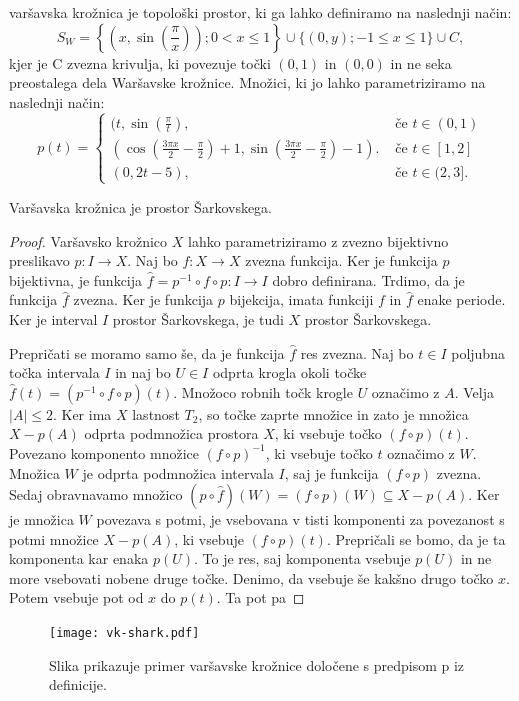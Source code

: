 \documentclass[../TG_magistrsko_delo_sections.tex]{subfiles}
\begin{document}
\begin{definicija}\label{def:vk}
varšavska krožnica je topološki prostor, ki ga lahko definiramo na naslednji način:
$$S_W = \left\{\left(x, \sin\left(\frac{\pi}{x}\right)\right); 0 < x \leq 1\right\} \cup \{(0, y); -1 \leq x \leq 1\} \cup C,$$
kjer je C zvezna krivulja, ki povezuje točki $(0,1)$ in $(0,0)$ in ne seka preostalega dela Waršavske krožnice.
Množici, ki jo lahko parametriziramo na naslednji način:
\[ p(t) = \begin{cases}
  (t, \sin(\frac{\pi}{t}), & \mbox{ če $t \in (0, 1) $}\\
 (\cos(\frac{3\pi x}{2}-\frac{\pi}{2})+1, \sin(\frac{3\pi x}{2}-\frac{\pi}{2})-1). & \mbox{ če $t \in [1, 2]$}\\
  (0, 2t-5), & \mbox{ če $t \in (2, 3]$.}
  \end{cases}
  \]
\end{definicija}

\begin{trditev}
Varšavska krožnica je prostor Šarkovskega.
\end{trditev}


\begin{proof}
Varšavsko krožnico $X$ lahko parametriziramo z zvezno bijektivno preslikavo $p:I \to X$. Naj bo $f: X \to X$ zvezna funkcija. Ker je funkcija $p$ bijektivna, je funkcija $\widehat{f} = p^{-1} \circ f \circ p : I \to I$ dobro definirana. Trdimo, da je funkcija $\widehat{f}$ zvezna. Ker je funkcija $p$ bijekcija, imata funkciji $f$ in $\widehat{f}$ enake periode. Ker je interval $I$ prostor Šarkovskega, je tudi $X$ prostor Šarkovskega. 

Prepričati se moramo samo še, da je funkcija $\widehat{f}$ res zvezna. Naj bo $t \in I$ poljubna točka intervala $I$ in naj bo $U \in I$ odprta krogla okoli točke $\widehat{f}(t) = (p^{-1} \circ f \circ p)(t)$. Množoco robnih točk krogle $U$ označimo z $A$. Velja $|A| \leq 2$. Ker ima $X$ lastnost $T_2$, so točke zaprte množice in zato je množica $X - p(A)$ odprta podmnožica prostora $X$, ki vsebuje točko $(f \circ p)(t)$. Povezano komponento množice $(f \circ p)^{-1}$, ki vsebuje točko $t$ označimo z $W$. Množica $W$ je odprta podmnožica intervala $I$, saj je funkcija $(f \circ p)$ zvezna. Sedaj obravnavamo množico $\left(p \circ \widehat{f}\right) (W) = (f \circ p)(W) \subseteq X - p(A)$. Ker je množica $W$ povezava s potmi, je vsebovana v tisti komponenti za povezanost s potmi množice $X-p(A)$, ki vsebuje $(f \circ p)(t)$. 
Prepričali se bomo, da je ta komponenta kar enaka $p(U)$. To je res, saj komponenta vsebuje $p(U)$ in ne more vsebovati nobene druge točke. Denimo, da vsebuje še kakšno drugo točko $x$. Potem vsebuje pot od $x$ do $p(t)$. Ta pot pa  
\end{proof}

\begin{figure}[h]
  \centering
  \texttt{[image: vk-shark.pdf]}
  \caption[Varšavska krožnica]{Slika prikazuje primer varšavske krožnice določene s predpisom p iz definicije.}
  \label{fig:varšavski}
\end{figure}
\end{document}
